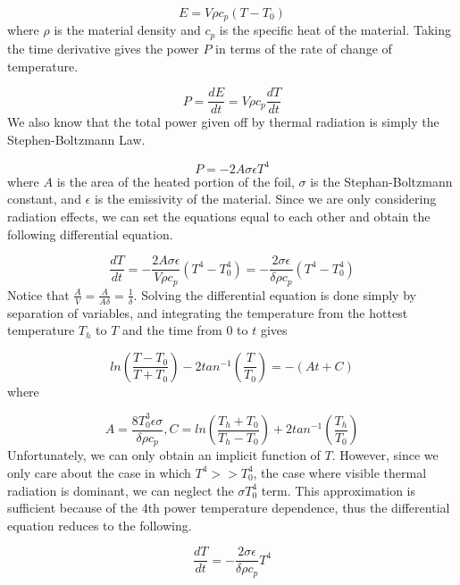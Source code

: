 \documentclass[12pt]{article}
\begin{document}
\begin{equation}
E=V \rho c_p (T-T_0)
\end{equation}
where $\rho$ is the material density and $c_p$ is the specific heat of the material. Taking the time derivative gives the power $P$ in terms of the rate of change of temperature.

\begin{equation}
P=\frac{dE}{dt}=V \rho c_p \frac{dT}{dt}
\end{equation}
We also know that the total power given off by thermal radiation is simply the Stephen-Boltzmann Law.

\begin{equation}
P=-2 A \sigma \epsilon T^4
\end{equation}
where $A$ is the area of the heated portion of the foil, $\sigma$ is the Stephan-Boltzmann constant, and $\epsilon$ is the emissivity of the material. Since we are only considering radiation effects, we can set the equations equal to each other and obtain the following differential equation.

\begin{equation}
\frac{dT}{dt}=-\frac{2 A \sigma \epsilon}{V \rho c_p} (T^4-T_{0}^{4})=-\frac{2 \sigma \epsilon}{\delta \rho c_p} (T^4-T_{0}^{4})
\end{equation}
Notice that $\frac{A}{V}=\frac{A}{A \delta}=\frac{1}{\delta}$. Solving the differential equation is done simply by separation of variables, and integrating the temperature from the hottest temperature $T_h$ to $T$ and the time from $0$ to $t$ gives

\begin{equation}
ln \left(\frac{T-T_0}{T+T_0} \right)-2tan^{-1} \left(\frac{T}{T_0} \right)=-(At+C)
\end{equation}
where

\begin{equation}
A=\frac{8T_{0}^{3} \epsilon \sigma}{\delta \rho c_p}, C=ln \left(\frac{T_h+T_0}{T_h-T_0} \right)+2tan^{-1} \left(\frac{T_h}{T_0} \right)
\end{equation}
Unfortunately, we can only obtain an implicit function of $T$. However, since we only care about the case in which $T^4>>T_{0}^{4}$, the case where visible thermal radiation is dominant, we can neglect the $\sigma T_{0}^{4}$ term. This approximation is sufficient because of the 4th power temperature dependence, thus the differential equation reduces to the following.

\begin{equation}
\frac{dT}{dt}=-\frac{2 \sigma \epsilon}{\delta \rho c_p} T^4
\end{equation}
\end{document}
